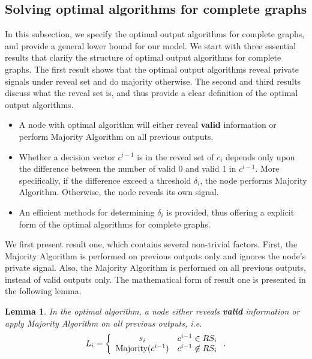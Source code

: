 \documentclass[a4paper,UKenglish]{lipics}
\newtheorem{lem}[thm]{Lemma}
\theoremstyle{definition}
\begin{document}
\subsection {Solving optimal algorithms for complete graphs}
In this subsection, we specify the optimal output algorithms for complete graphs,
	and provide a general lower bound for our model.
We start with three essential results that clarify the structure of optimal output algorithms for complete graphs.
The first result shows that the optimal output algorithms reveal private signals under reveal set and do majority otherwise.
The second and third results discuss what the reveal set is, and thus provide a clear definition of the optimal output algorithms.
\begin{itemize}
\item A node with optimal algorithm will either reveal \textbf{valid} information or perform Majority Algorithm on all previous outputs.
\item Whether a decision vector $c^{i-1}$ is in the reveal set of $c_i$ depends only upon
		the difference between the number of valid 0 and valid 1 in $c^{i-1}$.
	More specifically, if the difference exceed a threshold $\delta_i$, the node performs Majority Algorithm.
	Otherwise, the node reveals its own signal.
\item An efficient methods for determining $\delta_i$ is provided, thus offering a explicit form of the optimal algorithms for complete graphs.
\end{itemize}

We first present result one,
	which contains several non-trivial factors.
First, the Majority Algorithm is performed on previous outputs only and ignores the node's private signal.
Also, the Majority Algorithm is performed on all previous outputs, instead of valid outputs only.
The mathematical form of result one is presented in the following lemma.
\begin{lem}
\label{lem:reveal or majority}
In the optimal algorithm, a node either reveals \textbf{valid} information or apply Majority Algorithm on all previous outputs, i.e.
\begin{equation*}
L_i 
= \left\{ 
	\begin{array}{c l}
		s_i & c^{i-1} \in RS_i \\
 		\text{Majority}(c^{i-1}) & c^{i-1} \not \in RS_i
 	\end{array}
\right..
\end{equation*}
\end{lem}
\end{document}
